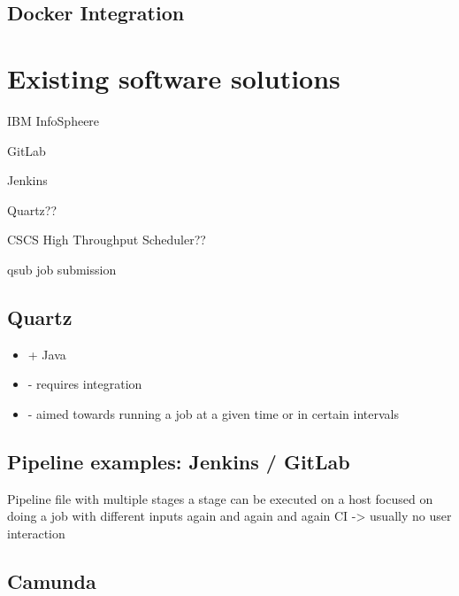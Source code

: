 \subsection{Docker Integration}



\section{Existing software solutions}

IBM InfoSpheere
\cite{infosphere:datastage}

GitLab \cite{gitlab:ci:yaml}

Jenkins \cite{jenkins:pipeline:jenkinsfile}

Quartz?? \cite{quartz:quickstart}

CSCS High Throughput Scheduler?? \cite{cscs:high_throughput}


qsub job submission %




\subsection{Quartz}

\cite{quartz:main}
\cite{quartz:overview}

\begin{itemize}
	\item + Java
	\item - requires integration
	\item - aimed towards running a job at a given time or in certain intervals
\end{itemize}

\subsection{Pipeline examples: Jenkins / GitLab}

Pipeline file with multiple stages
a stage can be executed on a host
focused on doing a job with different inputs again and again and again
CI -> usually no user interaction

\subsection{Camunda}

\cite{camunda:main}
\cite{camunda:process_engine_api}
\cite{camunda:rest_api_reference}

